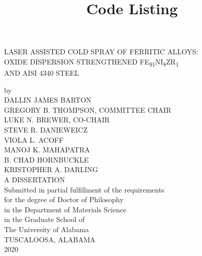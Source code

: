 \documentclass[a4paper,12pt,openany]{report} %
\title{Code Listing}
\begin{document}
		\let\ref\autoref %
	\begin{titlepage}
		\begin{center}
		
			
			\doublespacing
			
			\uppercase{Laser Assisted Cold Spray of Ferritic Alloys: \\
				Oxide Dispersion Strengthened F\MakeLowercase{e}\textsubscript{91}N\MakeLowercase{i}\textsubscript{8}Z\MakeLowercase{r}\textsubscript{1} \\
				and AISI 4340 steel}
			
			\vspace{\baselineskip}
			
			by
			\\
			\uppercase{Dallin James Barton
				\\
				\singlespacing
				Gregory B. Thompson, Committee Chair \\
				Luke N. Brewer, Co-Chair \\
				Steve R. Danieweicz \\
				Viola L. Acoff \\
				Manoj K. Mahapatra \\
				B. Chad Hornbuckle \\
				Kristopher A. Darling} \\
			\doublespacing
			\vspace{\baselineskip}
			\uppercase{a dissertation}\\
			\vspace{\baselineskip}
			\singlespacing
			Submitted in partial fulfillment of the requirements\\
			for the degree of Doctor of Philosophy \\
			in the Department of Materials Science \\
			in the Graduate School of\\
			The University of Alabama\\
			\doublespacing
			\vspace{\baselineskip}
			\vspace{\baselineskip}
			TUSCALOOSA, ALABAMA\\
			\vspace{\baselineskip}
			2020
			
			
		\end{center}
	\end{titlepage}
	
\end{document}
